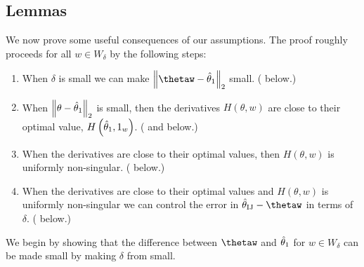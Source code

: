 \subsection{Lemmas}

We now prove some useful consequences of our assumptions. The proof
roughly proceeds for all $w\in W_{\delta}$ by the following steps:
\begin{enumerate}
\item When $\delta$ is small we can make $\norm{{{\thetaw}}-\thetaone}_{2}$
small. ( below.)
\item When $\left\Vert \theta-\hat{\theta}_{1}\right\Vert_{2}$ is small, then the derivatives
$H\left(\theta,w\right)$ are close to their optimal value, $H\left(\hat{\theta}_{1},1_{w}\right)$.
( and 
below.)
\item When the derivatives are close to their optimal values, then $H\left(\theta,w\right)$
is uniformly non-singular. ( below.)
\item When the derivatives are close to their optimal values and $H\left(\theta,w\right)$
is uniformly non-singular we can control the error in $\thetaij-\thetaw$
in terms of $\delta$. ( below.)
\end{enumerate}
We begin by showing that the difference between $\thetaw$ and $\hat{\theta}_{1}$
for $w\in W_{\delta}$ can be made small by making $\delta$ from
 small.

